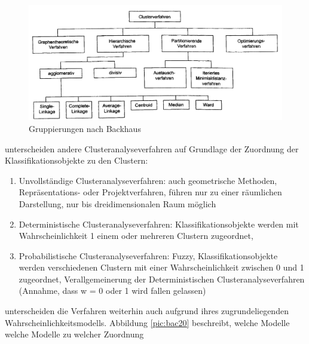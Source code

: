 \begin{figure}[h]
	\begin{center}
		\includegraphics[width=14cm]{pics/backhaus476.png}
	\end{center}
	\caption{Gruppierungen nach Backhaus}
	\label{pic:backhaus476}
\end{figure}

\citet[S. 18]{Bacher.2010} unterscheiden andere Clusteranalyseverfahren auf Grundlage der Zuordnung der Klassifikationsobjekte zu den Clustern:

\begin{enumerate}
	\item Unvollständige Clusteranalyseverfahren: auch geometrische Methoden, Repräsentations- oder Projektverfahren, führen nur zu einer räumlichen Darstellung, nur bis dreidimensionalen Raum möglich
	\item Deterministische Clusteranalyseverfahren: Klassifikationsobjekte werden mit Wahrscheinlichkeit 1 einem oder mehreren Clustern zugeordnet, 
	\item Probabilistische Clusteranalyseverfahren: Fuzzy, Klassifikationsobjekte werden verschiedenen Clustern mit einer Wahrscheinlichkeit zwischen 0 und 1 zugeordnet, Verallgemeinerung der Deterministischen Clusteranalyseverfahren (Annahme, dass w = 0 oder 1 wird fallen gelassen)
\end{enumerate}

\citet[S. 21]{Bacher.2010} unterscheiden die Verfahren weiterhin auch aufgrund ihres zugrundeliegenden Wahrscheinlichkeitsmodells. Abbildung \ref{pic:bac20} beschreibt, welche Modelle welche Modelle zu welcher Zuordnung

